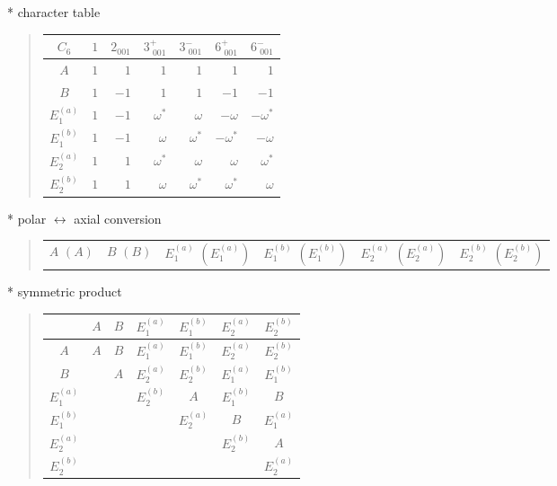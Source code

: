 \documentclass[fleqn,10pt,landscape]{jsarticle}
\begin{document}
* character table
\begin{quote}
\begin{tabular}{crrrrrr} \hline \hline
$ C_{6} $ & $ 1 $ & $ 2{}_{001} $ & $ 3^{+}_{\,\,001} $ & $ 3^{-}_{\,\,001} $ & $ 6^{+}_{\,\,001} $ & $ 6^{-}_{\,\,001} $ \\ \hline
$ A $ & $ 1 $ & $ 1 $ & $ 1 $ & $ 1 $ & $ 1 $ & $ 1 $ \\
$ B $ & $ 1 $ & $ -1 $ & $ 1 $ & $ 1 $ & $ -1 $ & $ -1 $ \\
$ E_{1}^{(a)} $ & $ 1 $ & $ -1 $ & $ \omega^{*} $ & $ \omega $ & $ - \omega $ & $ - \omega^{*} $ \\
$ E_{1}^{(b)} $ & $ 1 $ & $ -1 $ & $ \omega $ & $ \omega^{*} $ & $ - \omega^{*} $ & $ - \omega $ \\
$ E_{2}^{(a)} $ & $ 1 $ & $ 1 $ & $ \omega^{*} $ & $ \omega $ & $ \omega $ & $ \omega^{*} $ \\
$ E_{2}^{(b)} $ & $ 1 $ & $ 1 $ & $ \omega $ & $ \omega^{*} $ & $ \omega^{*} $ & $ \omega $ \\
 \hline \hline
\end{tabular}
\end{quote}
* polar $\leftrightarrow$ axial conversion
\begin{quote}
\begin{tabular}{cccccc}
$ A\,\,(A) $ & $ B\,\,(B) $ & $ E_{1}^{(a)}\,\,(E_{1}^{(a)}) $ & $ E_{1}^{(b)}\,\,(E_{1}^{(b)}) $ & $ E_{2}^{(a)}\,\,(E_{2}^{(a)}) $ & $ E_{2}^{(b)}\,\,(E_{2}^{(b)}) $
\end{tabular}
\end{quote}
* symmetric product
\begin{quote}
\begin{tabular}{c|cccccc} \hline \hline
 & $ A $ & $ B $ & $ E_{1}^{(a)} $ & $ E_{1}^{(b)} $ & $ E_{2}^{(a)} $ & $ E_{2}^{(b)} $ \\ \hline
$ A $ & $ A $ & $ B $ & $ E_{1}^{(a)} $ & $ E_{1}^{(b)} $ & $ E_{2}^{(a)} $ & $ E_{2}^{(b)} $ \\
$ B $ & $  $ & $ A $ & $ E_{2}^{(a)} $ & $ E_{2}^{(b)} $ & $ E_{1}^{(a)} $ & $ E_{1}^{(b)} $ \\
$ E_{1}^{(a)} $ & $  $ & $  $ & $ E_{2}^{(b)} $ & $ A $ & $ E_{1}^{(b)} $ & $ B $ \\
$ E_{1}^{(b)} $ & $  $ & $  $ & $  $ & $ E_{2}^{(a)} $ & $ B $ & $ E_{1}^{(a)} $ \\
$ E_{2}^{(a)} $ & $  $ & $  $ & $  $ & $  $ & $ E_{2}^{(b)} $ & $ A $ \\
$ E_{2}^{(b)} $ & $  $ & $  $ & $  $ & $  $ & $  $ & $ E_{2}^{(a)} $ \\
 \hline \hline
\end{tabular}
\end{quote}
\end{document}
